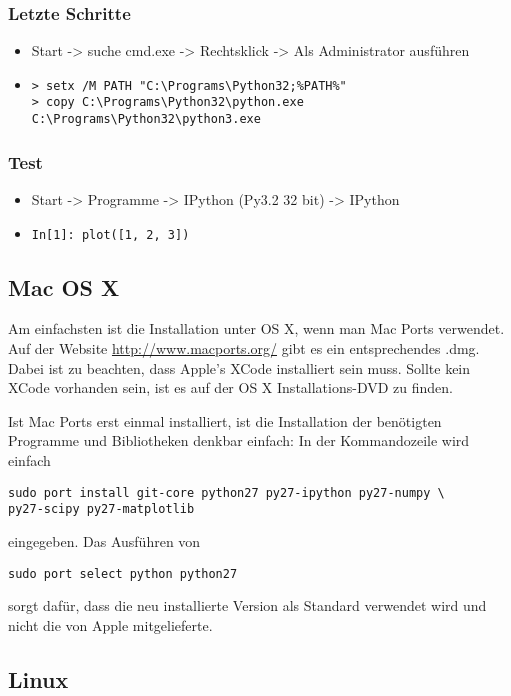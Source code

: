 \subsubsection{Letzte Schritte}
\begin{itemize}
  \item Start -> suche cmd.exe -> Rechtsklick -> Als Administrator ausführen
  \item
\begin{verbatim}
> setx /M PATH "C:\Programs\Python32;%PATH%"
> copy C:\Programs\Python32\python.exe C:\Programs\Python32\python3.exe
\end{verbatim}
\end{itemize}

\subsubsection{Test}
\begin{itemize}
  \item Start -> Programme -> IPython (Py3.2 32 bit) -> IPython
  \item \texttt{In[1]: plot([1, 2, 3])}
\end{itemize}

\subsection{Mac OS X}
Am einfachsten ist die Installation unter OS X, wenn man Mac Ports verwendet.
Auf der Website \url{http://www.macports.org/} gibt es ein entsprechendes .dmg.
Dabei ist zu beachten, dass Apple's XCode installiert sein muss.
Sollte kein XCode vorhanden sein, ist es auf der OS X Installations-DVD zu finden.

Ist Mac Ports erst einmal installiert, ist die Installation der benötigten Programme und Bibliotheken denkbar einfach: In der Kommandozeile wird einfach
\begin{verbatim}
sudo port install git-core python27 py27-ipython py27-numpy \
py27-scipy py27-matplotlib
\end{verbatim}
eingegeben.
Das Ausführen von
\begin{verbatim}
sudo port select python python27
\end{verbatim}
sorgt dafür, dass die neu installierte Version als Standard verwendet wird und nicht die von Apple mitgelieferte.

\subsection{Linux}

